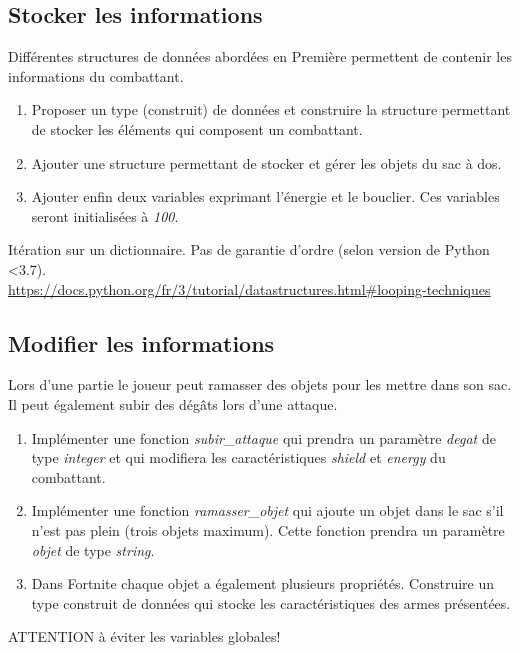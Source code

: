 \documentclass[a4paper,11pt]{article}
\begin{document}
\begin{Form}
\subsection{Stocker les informations}
Différentes structures de données abordées en Première permettent de contenir les informations du combattant.
\begin{activite}
\begin{enumerate}
\item Proposer un type (construit) de données et construire la structure permettant de stocker les éléments qui composent un combattant.
\item Ajouter une structure permettant de stocker et gérer les objets du sac à dos.
\item Ajouter enfin deux variables exprimant l'énergie et le bouclier. Ces variables seront initialisées à \emph{100}.
\end{enumerate} 
\end{activite}
\begin{commentprof}
Itération sur un dictionnaire. Pas de garantie d'ordre (selon version de Python <3.7).\\\url{https://docs.python.org/fr/3/tutorial/datastructures.html#looping-techniques}
\end{commentprof}
\subsection{Modifier les informations}
Lors d'une partie le joueur peut ramasser des objets pour les mettre dans son sac. Il peut également subir des dégâts lors d'une attaque.
\begin{activite}
\begin{enumerate}
\item Implémenter une fonction \emph{subir\_attaque} qui prendra un paramètre \emph{degat} de type \emph{integer} et qui modifiera les caractéristiques \emph{shield} et \emph{energy} du combattant. 
\item Implémenter une fonction \emph{ramasser\_objet} qui ajoute un objet dans le sac s'il n'est pas plein (trois objets maximum). Cette fonction prendra un paramètre \emph{objet} de type \emph{string}.
\item Dans Fortnite chaque objet a également plusieurs propriétés. Construire un type construit de données qui stocke les caractéristiques des armes présentées.
\end{enumerate}
\end{activite}
\begin{commentprof}
ATTENTION à éviter les variables globales!
\end{commentprof}
\begin{commentprof}

\end{commentprof}
\end{Form}
\end{document}
